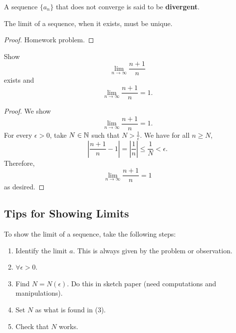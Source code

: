 \begin{definition}
  A sequence $\{a_n\}$ that does not converge is said
  to be \textbf{divergent}.
\end{definition}

\begin{theorem}
  The limit of a sequence, when it exists, must be
  unique.
\end{theorem}

\begin{proof}
  Homework problem.
\end{proof}

\begin{exercise}
  Show
  \[\lim_{n \to \infty} \frac{n+1}{n}\]
  exists and
  \[\lim_{n \to \infty} \frac{n+1}{n} = 1.\]
\end{exercise}

\begin{proof}
  We show
  \[\lim_{n \to \infty} \frac{n+1}{n} = 1.\]
  For every $\epsilon > 0$, take $N \in \mathbb{N}$ such that
  $N > \frac{1}{\epsilon}$. We have for all $n \ge N$,
  \[
  \left|\frac{n+1}{n} - 1\right| = \left|\frac{1}{n}\right| \le \frac{1}{N} < \epsilon
  .\]
  Therefore,
  \[
    \lim_{n \to \infty} \frac{n+1}{n} = 1
  \]
  as desired.
\end{proof}

\subsection{Tips for Showing Limits}
To show the limit of a sequence, take the following steps:
\begin{enumerate}
  \item Identify the limit $a$. This is always given
    by the problem or observation.
  \item $\forall \epsilon > 0$.
  \item Find $N = N(\epsilon)$. Do this in sketch paper
    (need computations and manipulations).
  \item Set $N$ as what is found in (3).
  \item Check that $N$ works.
\end{enumerate}
